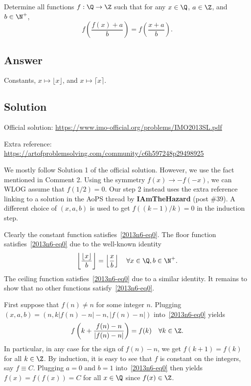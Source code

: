 Determine all functions $f : \Q \to \Z$ such that for any $x \in \Q$, $a \in \Z$, and $b \in \N^+$,
\[ f\left(\frac{f(x) + a}{b}\right) = f\left(\frac{x + a}{b}\right). \tag{*}\label{2013n6-eq0} \]



\subsection*{Answer}

Constants, $x \mapsto \lfloor x \rfloor$, and $x \mapsto \lceil x \rceil$.



\subsection*{Solution}

Official solution: \url{https://www.imo-official.org/problems/IMO2013SL.pdf}

Extra reference: \url{https://artofproblemsolving.com/community/c6h597248p29498925}

We mostly follow Solution 1 of the official solution.
However, we use the fact mentioned in Comment 2.
Using the symmetry $f(x) \to -f(-x)$, we can WLOG assume that $f(1/2) = 0$.
Our step 2 instead uses the extra reference linking to a solution in the AoPS thread by \textbf{IAmTheHazard} (post \#39).
A different choice of $(x, a, b)$ is used to get $f((k - 1)/k) = 0$ in the induction step.

Clearly the constant function satisfies~\eqref{2013n6-eq0}.
The floor function satisfies~\eqref{2013n6-eq0} due to the well-known identity
\[ \left\lfloor \dfrac{\lfloor x \rfloor}{b} \right\rfloor = \left\lfloor \dfrac{x}{b} \right\rfloor \quad \forall x \in \Q, b \in \N^+. \]
The ceiling function satisfies~\eqref{2013n6-eq0} due to a similar identity.
It remains to show that no other functions satisfy~\eqref{2013n6-eq0}.

First suppose that $f(n) \neq n$ for some integer $n$.
Plugging $(x, a, b) = (n, k|f(n) - n| - n, |f(n) - n|)$ into~\eqref{2013n6-eq0} yields
\[ f\left(k + \frac{f(n) - n}{|f(n) - n|}\right) = f(k) \quad \forall k \in \Z. \]
In particular, in any case for the sign of $f(n) - n$, we get $f(k + 1) = f(k)$ for all $k \in \Z$.
By induction, it is easy to see that $f$ is constant on the integers, say $f \equiv C$.
Plugging $a = 0$ and $b = 1$ into~\eqref{2013n6-eq0} then yields $f(x) = f(f(x)) = C$ for all $x \in \Q$ since $f(x) \in \Z$.

